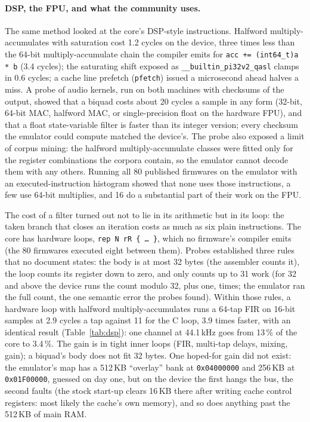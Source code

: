 \documentclass[10pt,a4paper]{article}
\newcommand{\code}[1]{\texttt{#1}}
\begin{document}
\paragraph{DSP, the FPU, and what the community uses.} The same method looked at the core's DSP-style
instructions. Halfword multiply-accumulates with saturation cost 1.2 cycles on the device, three times
less than the 64-bit multiply-accumulate chain the compiler emits for \code{acc += (int64\_t)a * b}
(3.4 cycles); the saturating shift exposed as \code{\_\_builtin\_pi32v2\_qasl} clamps in 0.6 cycles; a
cache line prefetch (\code{pfetch}) issued a microsecond ahead halves a miss. A probe of audio
kernels, run on both machines with checksums of the output, showed that a biquad costs about 20
cycles a sample in any form (32-bit, 64-bit MAC, halfword MAC, or single-precision float on the
hardware FPU), and that a float state-variable filter is faster than its integer version; every
checksum the emulator could compute matched the device's. The probe also exposed a limit of corpus
mining: the halfword multiply-accumulate classes were fitted only for the register combinations the
corpora contain, so the emulator cannot decode them with any others. Running all 80 published
firmwares on the emulator with an executed-instruction histogram showed that none uses those
instructions, a few use 64-bit multiplies, and 16 do a substantial part of their work on the FPU.

The cost of a filter turned out not to lie in its arithmetic but in its loop: the taken branch that
closes an iteration costs as much as six plain instructions. The core has hardware loops,
\code{rep N rR \{ \ldots\ \}}, which no firmware's compiler emits (the 80 firmwares executed eight
between them). Probes established three rules that no document states: the body is at most 32 bytes
(the assembler counts it), the loop counts its register down to zero, and only counts up to 31 work
(for 32 and above the device runs the count modulo 32, plus one, times; the emulator ran the full
count, the one semantic error the probes found). Within those rules, a hardware loop with halfword
multiply-accumulates runs a 64-tap FIR on 16-bit samples at 2.9 cycles a tap against 11 for the C
loop, 3.9 times faster, with an identical result (Table~\ref{tab:dsp}): one channel at 44.1\,kHz goes
from 13\,\% of the core to 3.4\,\%. The gain is in tight inner loops (FIR, multi-tap delays, mixing,
gain); a biquad's body does not fit 32 bytes. One hoped-for gain did not exist: the emulator's map has
a 512\,KB ``overlay'' bank at \code{0x04000000} and 256\,KB at \code{0x01F00000}, guessed on day one, but
on the device the first hangs the bus, the second faults (the stock start-up clears 16\,KB there after
writing cache control registers: most likely the cache's own memory), and so does anything past the
512\,KB of main RAM.
\end{document}
